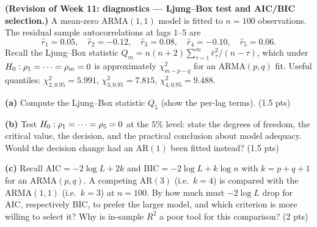 \documentclass[11pt]{article}
\begin{document}
\textbf{(Revision of Week 11: diagnostics --- Ljung--Box test and AIC/BIC selection.)} A mean-zero $\mathrm{ARMA}(1,1)$ model is fitted to $n=100$ observations. The residual sample autocorrelations at lags $1$--$5$ are
\[
\hat r_1=0.05,\quad \hat r_2=-0.12,\quad \hat r_3=0.08,\quad \hat r_4=-0.10,\quad \hat r_5=0.06 .
\]
Recall the Ljung--Box statistic $Q_m=n(n+2)\sum_{\tau=1}^{m}\hat r_\tau^2/(n-\tau)$, which under $H_0:\rho_1=\cdots=\rho_m=0$ is approximately $\chi^2_{m-p-q}$ for an $\mathrm{ARMA}(p,q)$ fit. Useful quantiles: $\chi^2_{2,0.95}=5.991$, $\chi^2_{3,0.95}=7.815$, $\chi^2_{4,0.95}=9.488$.

\textbf{(a)} Compute the Ljung--Box statistic $Q_5$ (show the per-lag terms). \hfill(1.5 pts)

\textbf{(b)} Test $H_0:\rho_1=\cdots=\rho_5=0$ at the $5\%$ level: state the degrees of freedom, the critical value, the decision, and the practical conclusion about model adequacy. Would the decision change had an $\mathrm{AR}(1)$ been fitted instead? \hfill(1.5 pts)

\textbf{(c)} Recall $\mathrm{AIC}=-2\log L+2k$ and $\mathrm{BIC}=-2\log L+k\log n$ with $k=p+q+1$ for an $\mathrm{ARMA}(p,q)$. A competing $\mathrm{AR}(3)$ (i.e.\ $k=4$) is compared with the $\mathrm{ARMA}(1,1)$ (i.e.\ $k=3$) at $n=100$. By how much must $-2\log L$ drop for AIC, respectively BIC, to prefer the larger model, and which criterion is more willing to select it? Why is in-sample $R^2$ a poor tool for this comparison? \hfill(2 pts)
\answerpage
\end{document}
